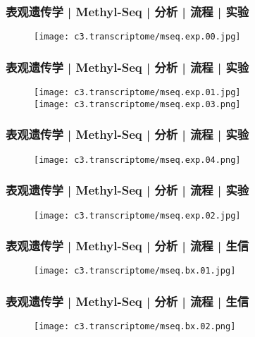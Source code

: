 \begin{frame}
  \frametitle{表观遗传学 | Methyl-Seq | 分析 | 流程 | 实验}
  \begin{figure}
    \centering
    \texttt{[image: c3.transcriptome/mseq.exp.00.jpg]}
  \end{figure}
\end{frame}

\begin{frame}
  \frametitle{表观遗传学 | Methyl-Seq | 分析 | 流程 | 实验}
  \begin{figure}
    \centering
    \texttt{[image: c3.transcriptome/mseq.exp.01.jpg]}\\
    \vspace{1em}
    \texttt{[image: c3.transcriptome/mseq.exp.03.png]}
  \end{figure}
\end{frame}

\begin{frame}
  \frametitle{表观遗传学 | Methyl-Seq | 分析 | 流程 | 实验}
  \begin{figure}
    \centering
    \texttt{[image: c3.transcriptome/mseq.exp.04.png]}
  \end{figure}
\end{frame}

\begin{frame}
  \frametitle{表观遗传学 | Methyl-Seq | 分析 | 流程 | 实验}
  \begin{figure}
    \centering
    \texttt{[image: c3.transcriptome/mseq.exp.02.jpg]}
  \end{figure}
\end{frame}

\begin{frame}
  \frametitle{表观遗传学 | Methyl-Seq | 分析 | 流程 | 生信}
  \begin{figure}
    \centering
    \texttt{[image: c3.transcriptome/mseq.bx.01.jpg]}
  \end{figure}
\end{frame}

\begin{frame}
  \frametitle{表观遗传学 | Methyl-Seq | 分析 | 流程 | 生信}
  \begin{figure}
    \centering
    \texttt{[image: c3.transcriptome/mseq.bx.02.png]}
  \end{figure}
\end{frame}

